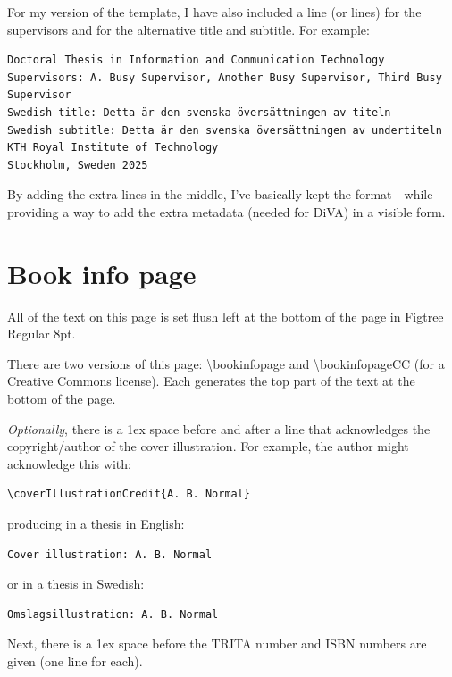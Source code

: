 \documentclass[12pt, twoside]{article}
\begin{document}
For my version of the template, I have also included a line (or lines) for the supervisors and for the alternative title and subtitle. 
For example:
\begin{lstlisting}
Doctoral Thesis in Information and Communication Technology
Supervisors: A. Busy Supervisor, Another Busy Supervisor, Third Busy Supervisor
Swedish title: Detta är den svenska översättningen av titeln
Swedish subtitle: Detta är den svenska översättningen av undertiteln
KTH Royal Institute of Technology
Stockholm, Sweden 2025
\end{lstlisting}

By adding the extra lines in the middle, I've basically kept the format - while providing a way to add the extra metadata (needed for DiVA) in a visible form.

\section{Book info page}
\label{sec:cycle3BookinfoPage}

All of the text on this page is set flush left at the bottom of the page in Figtree Regular 8pt.

There are two versions of this page: \textbackslash bookinfopage and \textbackslash bookinfopageCC (for a Creative Commons license). Each generates the top part of the text at the bottom of the page.

\textit{Optionally}, there is a 1ex space before and after a line that acknowledges the copyright/author of the cover illustration. For example, the author might acknowledge this with:
\begin{lstlisting}[style=latexExampleForAuthors]
\coverIllustrationCredit{A. B. Normal}
\end{lstlisting}
producing in a thesis in English:
\begin{verbatim}
Cover illustration: A. B. Normal
\end{verbatim}
or in a thesis in Swedish:
\begin{verbatim}
Omslagsillustration: A. B. Normal
\end{verbatim}

Next, there is a 1ex space before the TRITA number and ISBN numbers are given (one line for each).
\end{document}
